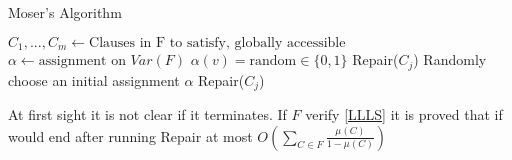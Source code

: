 \begin{algorithm}
\caption{Moser's Algorithm}\label{euclid}
\begin{algorithmic}[1]
  \State $C_1,...,C_m \gets \text{Clauses in F to satisfy, globally accessible}$
  \State $\alpha \gets \text{assignment on }Var(F)$
  \State
  \State $\alpha(v) = \text{random} \in \{0,1\}$
  \EndFor
  \State Repair($C_j$)
  \EndIf
  \EndFor
  \EndProcedure
  \State
  \State Randomly choose an initial assignment $\alpha$
  \State Repair($C_j$)

\end{algorithmic}
\end{algorithm}


At first sight it is not clear if it terminates. If $F$ verify \ref{LLLS} it is proved that if would end after running Repair at most  $O(\sum_{C\in F} \frac{\mu(C)}{1-\mu(C)})$


